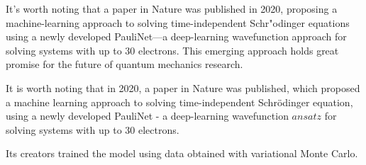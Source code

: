 It's worth noting that a paper in Nature was published in 2020, proposing a machine-learning approach to solving time-independent Schr{"o}dinger equations using a newly developed PauliNet—a deep-learning wavefunction approach for solving systems with up to 30 electrons. This emerging approach holds great promise for the future of quantum mechanics research.

It is worth noting that in 2020, a paper in Nature was published, which proposed a machine learning approach to solving time-independent Schr{\"o}dinger equation, using a newly developed PauliNet - a deep-learning wavefunction $ansatz$ for solving systems with up to 30 electrons.

Its creators trained the model using data obtained with variational Monte Carlo.
\cite{hermann_deep-neural-network_2020}

